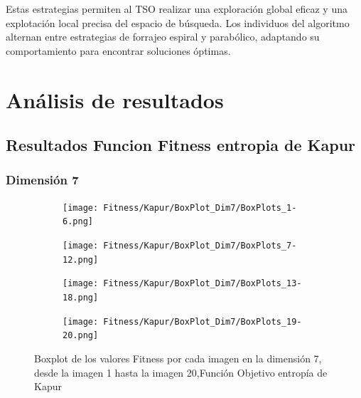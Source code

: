 \documentclass[conference]{IEEEtran}
\begin{document}
\noindent Estas estrategias permiten al TSO realizar una exploración global eficaz y una explotación local precisa del espacio de búsqueda. Los individuos del algoritmo alternan entre estrategias de forrajeo espiral y parabólico, adaptando su comportamiento para encontrar soluciones óptimas.



\section{Análisis de resultados} \label{sec:ce}
\subsection{Resultados Funcion Fitness entropia de Kapur}
\subsubsection{Dimensión 7}
\begin{figure}
	\centering
	
	\begin{subfigure}{0.38\textwidth}
		\texttt{[image: Fitness/Kapur/BoxPlot\_Dim7/BoxPlots\_1-6.png]}
	\end{subfigure}
	
	\begin{subfigure}{0.38\textwidth}
		\texttt{[image: Fitness/Kapur/BoxPlot\_Dim7/BoxPlots\_7-12.png]}
	\end{subfigure}
	\begin{subfigure}{0.38\textwidth}
		\texttt{[image: Fitness/Kapur/BoxPlot\_Dim7/BoxPlots\_13-18.png]}
	\end{subfigure}
	\begin{subfigure}{0.38\textwidth}
		\texttt{[image: Fitness/Kapur/BoxPlot\_Dim7/BoxPlots\_19-20.png]}
		\vspace{-120pt} %
	\end{subfigure}
	\caption{Boxplot de los valores Fitness por cada imagen en la dimensión 7, desde la imagen 1 hasta la imagen 20,Función Objetivo entropía de Kapur}
	\label{fig:Boxplot_Fitnes_Dim7_Kapur}    
\end{figure}
\end{document}
